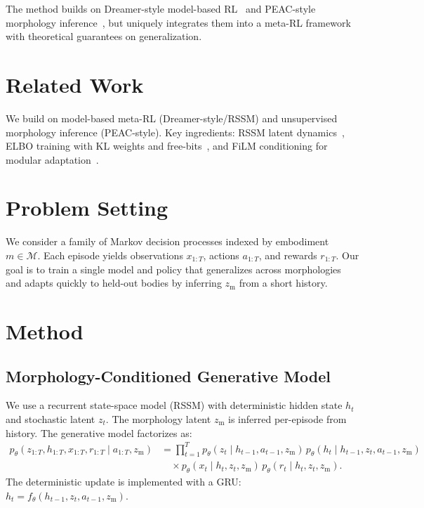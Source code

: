 \documentclass{article}
\begin{document}
The method builds on Dreamer-style model-based RL~\cite{hafner2020dreamer} and PEAC-style morphology inference~\cite{peac2024}, but uniquely integrates them into a meta-RL framework with theoretical guarantees on generalization.

\section{Related Work}
We build on model-based meta-RL (Dreamer-style/RSSM) and unsupervised morphology inference (PEAC-style). Key ingredients: RSSM latent dynamics~\cite{hafner2020dreamer}, ELBO training with KL weights and free-bits~\cite{kingma2013, Higgins2017betaVAE}, and FiLM conditioning for modular adaptation~\cite{perez2018film}.

\section{Problem Setting}
We consider a family of Markov decision processes indexed by embodiment $m\in\mathcal{M}$. Each episode yields observations $x_{1:T}$, actions $a_{1:T}$, and rewards $r_{1:T}$. Our goal is to train a single model and policy that generalizes across morphologies and adapts quickly to held-out bodies by inferring $z_{\mathrm{m}}$ from a short history.

\section{Method}
\subsection{Morphology-Conditioned Generative Model}
We use a recurrent state-space model (RSSM) with deterministic hidden state $h_t$ and stochastic latent $z_t$. The morphology latent $z_{\mathrm{m}}$ is inferred per-episode from history. The generative model factorizes as:
\begin{align}
    p_\theta(z_{1:T}, h_{1:T}, x_{1:T}, r_{1:T} \mid a_{1:T}, z_{\mathrm{m}})
    &= \prod_{t=1}^T p_\theta(z_t \mid h_{t-1}, a_{t-1}, z_{\mathrm{m}}) \, p_\theta(h_t \mid h_{t-1}, z_t, a_{t-1}, z_{\mathrm{m}}) \\
    &\quad \times p_\theta(x_t \mid h_t, z_t, z_{\mathrm{m}})\, p_\theta(r_t \mid h_t, z_t, z_{\mathrm{m}}).
\end{align}
The deterministic update is implemented with a GRU: $h_t = f_\theta(h_{t-1}, z_t, a_{t-1}, z_{\mathrm{m}})$.
\end{document}
